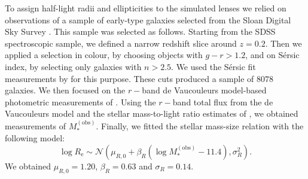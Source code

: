 \documentclass{aa}
\def\reff{R_{\mathrm{e}}}
\def\mobs{M_*^{(\mathrm{obs})}}
\begin{document}
To assign half-light radii and ellipticities to the simulated lenses we relied on observations of a sample of early-type galaxies selected from the Sloan Digital Sky Survey \citep[SDSS][]{Yor++00}.
This sample was selected as follows. Starting from the SDSS spectroscopic sample, we defined a narrow redshift slice around $z=0.2$. Then we applied a selection in colour, by choosing objects with $g-r>1.2$, and on S\'{e}rsic index, by selecting only galaxies with $n>2.5$. We used the S\'{e}rsic fit measurements by \citet{Mee++15} for this purpose. These cuts produced a sample of $8078$ galaxies.
We then focused on the $r-$band de Vaucouleurs model-based photometric measurements of \citet{Mee++15}.
Using the $r-$band total flux from the de Vaucouleurs model and the stellar mass-to-light ratio estimates of \citet{Men++14}, we obtained measurements of $\mobs$. Finally, we fitted the stellar mass-size relation with the following model:
\begin{equation}
\log{\reff} \sim \mathcal{N}(\mu_{R,0} + \beta_R(\log{\mobs} - 11.4), \sigma_R^2).
\end{equation}
We obtained $\mu_{R,0}=1.20$, $\beta_R=0.63$ and $\sigma_R=0.14$.
\end{document}
